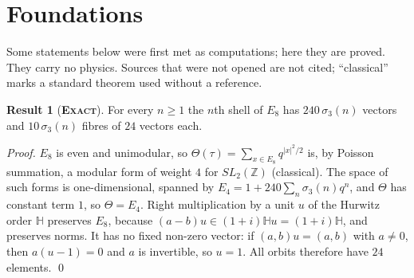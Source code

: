 \documentclass[11pt]{article}
\newcommand{\exact}{\textbf{\textsc{Exact}}}
\theoremstyle{definition}
\newtheorem{result}{Result}
\begin{document}

\section{Foundations}\label{sec:found}
Some statements below were first met as computations; here they are proved. They carry no physics. Sources that were not opened are not cited; ``classical'' marks a standard theorem used without a reference.
\begin{result}[\exact]\label{res:found-shell}
For every $n\ge1$ the $n$th shell of $E_8$ has $240\,\sigma_3(n)$ vectors and $10\,\sigma_3(n)$ fibres of $24$ vectors each.
\end{result}
\emph{Proof.} $E_8$ is even and unimodular, so $\Theta(\tau)=\sum_{x\in E_8}q^{|x|^2/2}$ is, by Poisson summation, a modular form of weight $4$ for $SL_2(\mathbb{Z})$ (classical). The space of such forms is one-dimensional, spanned by $E_4=1+240\sum_n\sigma_3(n)q^n$, and $\Theta$ has constant term $1$, so $\Theta=E_4$. Right multiplication by a unit $u$ of the Hurwitz order $\mathbb{H}$ preserves $E_8$, because $(a-b)u\in(1+i)\mathbb{H}u=(1+i)\mathbb{H}$, and preserves norms. It has no fixed non-zero vector: if $(a,b)u=(a,b)$ with $a\ne0$, then $a(u-1)=0$ and $a$ is invertible, so $u=1$. All orbits therefore have $24$ elements. \qed
\end{document}
